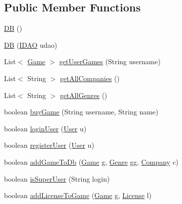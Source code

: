 \subsection*{Public Member Functions}
\begin{DoxyCompactItemize}
\item 
\hyperlink{classes_1_1deusto_1_1server_1_1db_1_1_d_b_ab53f32f36928ba9aa3ddff65fce395dc}{DB} ()
\item 
\hyperlink{classes_1_1deusto_1_1server_1_1db_1_1_d_b_abcfd35c624e742697bc2b1d1df8cc92a}{DB} (\hyperlink{interfacees_1_1deusto_1_1server_1_1db_1_1dao_1_1_i_d_a_o}{I\+D\+AO} udao)
\item 
List$<$ \hyperlink{classes_1_1deusto_1_1server_1_1db_1_1data_1_1_game}{Game} $>$ \hyperlink{classes_1_1deusto_1_1server_1_1db_1_1_d_b_a1c471589284782e7ff1190f2b6c2369e}{get\+User\+Games} (String username)
\item 
List$<$ String $>$ \hyperlink{classes_1_1deusto_1_1server_1_1db_1_1_d_b_a59802aeefdd9d445152fbd548a964708}{get\+All\+Companies} ()
\item 
List$<$ String $>$ \hyperlink{classes_1_1deusto_1_1server_1_1db_1_1_d_b_a741c4c8b38c31010d5c86e1586ffa880}{get\+All\+Genres} ()
\item 
boolean \hyperlink{classes_1_1deusto_1_1server_1_1db_1_1_d_b_a8aa2e7531181a31b54850ca6665f87c2}{buy\+Game} (String username, String name)
\item 
boolean \hyperlink{classes_1_1deusto_1_1server_1_1db_1_1_d_b_a8e5744311b5924e740d190673abee104}{login\+User} (\hyperlink{classes_1_1deusto_1_1server_1_1db_1_1data_1_1_user}{User} u)
\item 
boolean \hyperlink{classes_1_1deusto_1_1server_1_1db_1_1_d_b_a888f468b3fc2a05520fca9ac135823e3}{register\+User} (\hyperlink{classes_1_1deusto_1_1server_1_1db_1_1data_1_1_user}{User} u)
\item 
boolean \hyperlink{classes_1_1deusto_1_1server_1_1db_1_1_d_b_a376112d91f8e3018821fd9362f6598ae}{add\+Game\+To\+Db} (\hyperlink{classes_1_1deusto_1_1server_1_1db_1_1data_1_1_game}{Game} g, \hyperlink{classes_1_1deusto_1_1server_1_1db_1_1data_1_1_genre}{Genre} gg, \hyperlink{classes_1_1deusto_1_1server_1_1db_1_1data_1_1_company}{Company} c)
\item 
boolean \hyperlink{classes_1_1deusto_1_1server_1_1db_1_1_d_b_a53a59425c7690f07861fd5d006f83cbc}{is\+Super\+User} (String login)
\item 
boolean \hyperlink{classes_1_1deusto_1_1server_1_1db_1_1_d_b_a5f4f68a9d2b7d6e8fbcc6e28136b92c8}{add\+License\+To\+Game} (\hyperlink{classes_1_1deusto_1_1server_1_1db_1_1data_1_1_game}{Game} g, \hyperlink{classes_1_1deusto_1_1server_1_1db_1_1data_1_1_license}{License} l)

\end{DoxyCompactItemize}
